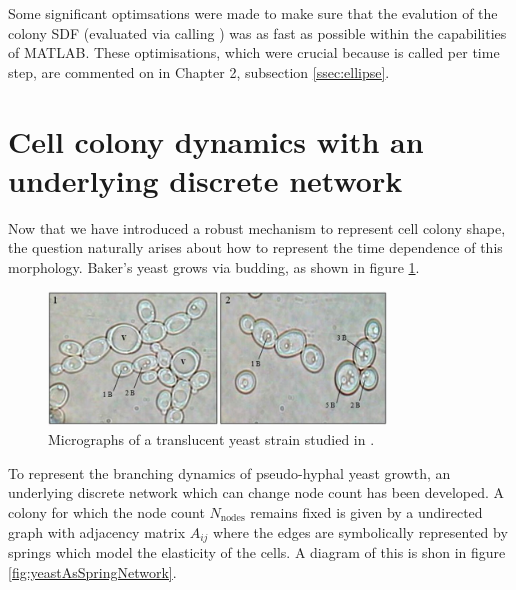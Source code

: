 Some significant optimsations were made to make sure that the evalution of 
the colony SDF (evaluated via calling ) was as fast as 
possible within the capabilities of MATLAB. These 
optimisations, which were crucial because  is called per time step, 
are commented on in Chapter 2, subsection \ref{ssec:ellipse}.

\section{Cell colony dynamics with an underlying discrete network}
Now that we have introduced a robust mechanism to represent cell colony 
shape, the question naturally arises about how to represent the time dependence of this 
morphology. Baker's yeast grows via budding,
as shown in figure \ref{fig:yeastMicrograph}.
\begin{figure}[!htb]
    \centering
    \includegraphics[width=0.8\textwidth]{chapter1/figures/yeastMicrograph.png}
    \caption{Micrographs of a translucent yeast strain studied
             in \cite{ebrahimi2020yeast}.}
    \label{fig:yeastMicrograph}
\end{figure}
To represent the branching dynamics of pseudo-hyphal yeast growth, 
an underlying discrete network which can change node count has been developed.
A colony for which the node count $N_{\textrm{nodes}}$ remains fixed is given 
by a undirected graph with adjacency matrix $A_{ij}$ where the edges are symbolically
represented by springs which model the elasticity of the cells. 
A diagram of this is shon in figure \ref{fig:yeastAsSpringNetwork}. 
